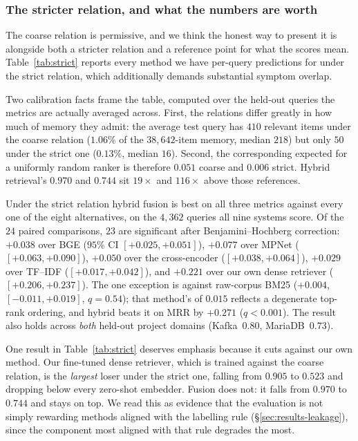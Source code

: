 \subsubsection*{The stricter relation, and what the numbers are worth}
\label{sec:results-strict}

The coarse relation is permissive, and we think the honest way to present it is
alongside both a stricter relation and a reference point for what the scores
mean. Table~\ref{tab:strict} reports every method we have per-query predictions
for under the strict relation, which additionally demands substantial symptom
overlap.

Two calibration facts frame the table, computed over the held-out queries the
metrics are actually averaged across. First, the relations differ greatly in how
much of memory they admit: the average test query has $410$ relevant items under
the coarse relation ($1.06\%$ of the $38{,}642$-item memory, median $218$) but
only $50$ under the strict one ($0.13\%$, median $16$). Second, the corresponding
expected  for a uniformly random ranker is therefore $0.051$ coarse and
$0.006$ strict. Hybrid retrieval's $0.970$ and $0.744$ sit $19\times$ and
$116\times$ above those references.

Under the strict relation hybrid fusion is best on all three metrics against
every one of the eight alternatives, on the $4{,}362$ queries all nine systems
score. Of the $24$ paired comparisons, $23$ are significant after
Benjamini--Hochberg correction: $+0.038$  over BGE ($95\%$ CI
$[+0.025,+0.051]$), $+0.077$ over MPNet ($[+0.063,+0.090]$), $+0.050$ over the
cross-encoder ($[+0.038,+0.064]$), $+0.029$ over TF--IDF ($[+0.017,+0.042]$), and
$+0.221$ over our own dense retriever ($[+0.206,+0.237]$). The one exception is
 against raw-corpus BM25 ($+0.004$, $[-0.011,+0.019]$, $q=0.54$); that
method's  of $0.015$ reflects a degenerate top-rank ordering, and hybrid
beats it on MRR by $+0.271$ ($q<0.001$). The result also holds across \emph{both}
held-out project domains (Kafka~$0.80$, MariaDB~$0.73$).

One result in Table~\ref{tab:strict} deserves emphasis because it cuts against
our own method. Our fine-tuned dense retriever, which is trained against the
coarse relation, is the \emph{largest} loser under the strict one, falling from
$0.905$ to $0.523$ and dropping below every zero-shot embedder. Fusion does not:
it falls from $0.970$ to $0.744$ and stays on top. We read this as evidence that
the evaluation is not simply rewarding methods aligned with the labelling rule
(\S\ref{sec:results-leakage}), since the component most aligned with that rule
degrades the most.

